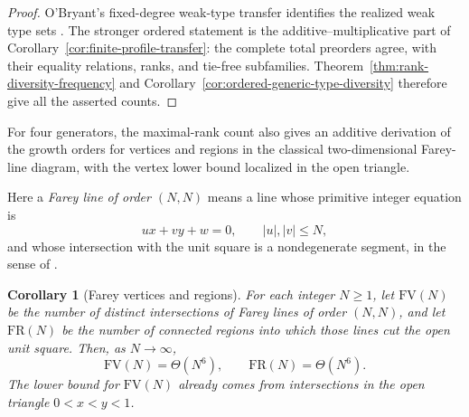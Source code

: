 \documentclass[11pt,reqno]{amsart}
\newtheorem{corollary}[theorem]{Corollary}
\theoremstyle{definition}
\theoremstyle{remark}
\begin{document}
\begin{proof}
O'Bryant's fixed-degree weak-type transfer identifies the realized weak type
sets \cite[Theorem~9]{OBryant2025}.  The stronger ordered statement is the
additive--multiplicative part of Corollary~\ref{cor:finite-profile-transfer}:
the complete total preorders agree, with their equality relations, ranks, and
tie-free subfamilies.  Theorem~\ref{thm:rank-diversity-frequency} and
Corollary~\ref{cor:ordered-generic-type-diversity} therefore give all the
asserted counts.
\end{proof}

For four generators, the maximal-rank count also gives an additive derivation
of the growth orders for vertices and regions in the classical
two-dimensional Farey-line diagram, with the vertex lower bound localized in
the open triangle.

Here a \emph{Farey line of order $(N,N)$} means a line whose primitive
integer equation is
\[
 ux+vy+w=0,
 \qquad |u|,|v|\leq N,
\]
and whose intersection with the unit square is a nondegenerate segment, in
the sense of \cite[Definition~1]{KhoshnoudiradFareyLines2015}.

\begin{corollary}[Farey vertices and regions]
\label{cor:farey-sixth-order}
For each integer $N\geq1$, let $\mathrm{FV}(N)$ be the number of distinct
intersections of Farey lines of order $(N,N)$, and let $\mathrm{FR}(N)$ be
the number of connected regions into which those lines cut the open unit
square.  Then, as $N\to\infty$,
\begin{equation}\label{eq:farey-sixth-order}
 \mathrm{FV}(N)=\Theta(N^6),\qquad
 \mathrm{FR}(N)=\Theta(N^6).
\end{equation}
The lower bound for $\mathrm{FV}(N)$ already comes from intersections in
the open triangle $0<x<y<1$.
\end{corollary}
\end{document}
